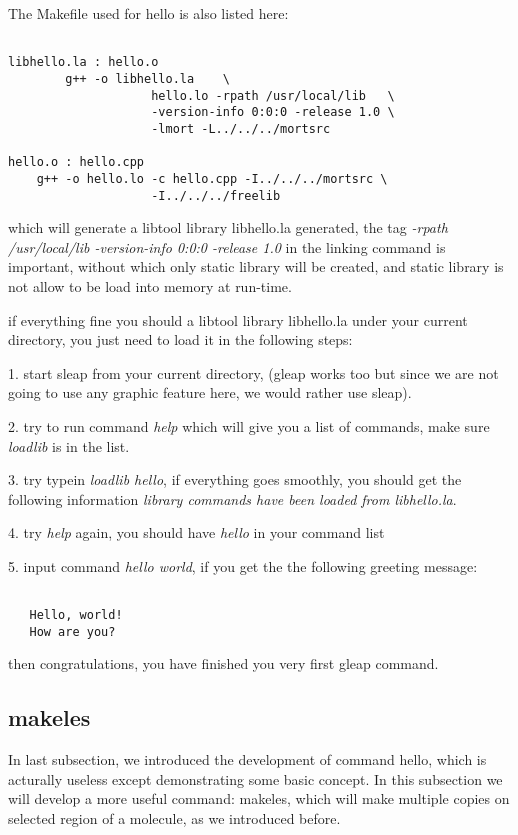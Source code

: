 \documentclass[letterpaper]{book}
\begin{document}
The Makefile used for hello is also listed here:

\begin{lstlisting}

libhello.la : hello.o
        g++ -o libhello.la    \ 
                    hello.lo -rpath /usr/local/lib   \
                    -version-info 0:0:0 -release 1.0 \
                    -lmort -L../../../mortsrc

hello.o : hello.cpp
	g++ -o hello.lo -c hello.cpp -I../../../mortsrc \
                    -I../../../freelib
\end{lstlisting}

which will generate a libtool library libhello.la generated, the tag 
{\it -rpath /usr/local/lib -version-info 0:0:0 -release 1.0} in  the 
linking command is important, without which only static library will
be created, and static library is not allow to be load into memory
at run-time.

if everything fine you should a libtool library libhello.la under your
current directory, you just need to load it in the following steps:


1. start sleap from your current directory, (gleap works too but since
   we are not going to use any graphic feature here, we would rather
   use sleap).


2. try to run command {\it help} which will give you a list of commands,
   make sure {\it loadlib} is in the list.


3. try typein {\it loadlib hello}, if everything goes smoothly, you should
   get the following information {\it library commands have been loaded 
   from libhello.la}.


4. try {\it help} again, you should have {\it hello} in your command list


5. input command {\it hello world}, if you get the the following greeting
   message:
\begin{lstlisting}

   Hello, world!
   How are you?

\end{lstlisting}

then congratulations, you have finished you very first gleap command.


\subsection{makeles}
In last subsection, we introduced the development of command hello, which is 
acturally useless except demonstrating some basic concept. In this subsection
we will develop a more useful command: makeles, which will make multiple copies
on selected region of a molecule, as we introduced before.
\end{document}
